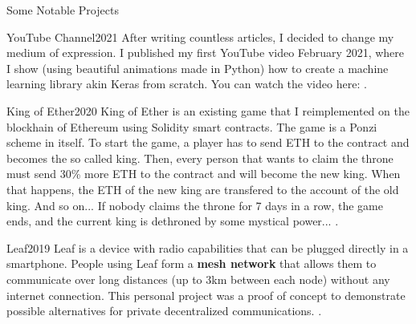 \documentclass{resume}
\begin{document}
    \begin{rSection}{Some Notable Projects}
        \begin{project}{YouTube Channel}{2021}{
            After writing countless articles, I decided to change my medium of expression. I published my first YouTube video February 2021, where I show (using beautiful animations made in Python) how to create a machine learning library akin Keras from scratch. You can watch the video here: .
        }
        \end{project}

        \begin{project}{King of Ether}{2020}{
            King of Ether is an existing game that I reimplemented on the blockhain of Ethereum using Solidity smart contracts. The game is a Ponzi scheme in itself. To start the game, a player has to send ETH to the contract and becomes the so called king. Then, every person that wants to claim the throne must send 30\% more ETH to the contract and will become the new king. When that happens, the ETH of the new king are transfered to the account of the old king. And so on... If nobody claims the throne for 7 days in a row, the game ends, and the current king is dethroned by some mystical power... .
        }
        \end{project}

	    \begin{project}{Leaf}{2019}{
            Leaf is a device with radio capabilities that can be plugged directly in a smartphone. People using Leaf form a \textbf{mesh network} that allows them to communicate over long distances (up to 3km between each node) without any internet connection. This personal project was a proof of concept to demonstrate possible alternatives for private decentralized communications. .
        }
        \end{project}


\end{rSection}
\end{document}
